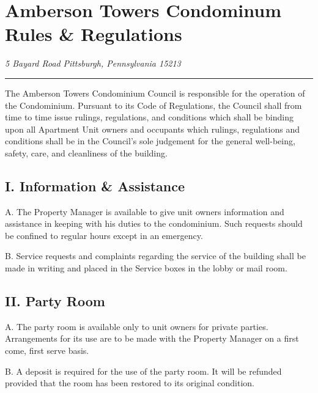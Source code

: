 \documentclass[
]{book}
\begin{document}
\hypertarget{amberson-towers-condominum-rules-regulations-2}{%
\chapter{\texorpdfstring{Amberson Towers Condominum Rules \& Regulations}{Amberson Towers Condominum   Rules \& Regulations}}\label{amberson-towers-condominum-rules-regulations-2}}

\emph{5 Bayard Road}
\emph{Pittsburgh, Pennsylvania 15213}

\begin{center}\rule{0.5\linewidth}{0.5pt}\end{center}

The Amberson Towers Condominium Council is responsible for the operation of the Condominium. Pursuant to its Code of Regulations, the Council shall from time to time issue rulings, regulations, and conditions which shall be binding upon all Apartment Unit owners and occupants which rulings, regulations and conditions shall be in the Council's sole judgement for the general well-being, safety, care, and cleanliness of the building.

\hypertarget{i.-information-assistance-2}{%
\section*{I. Information \& Assistance}\label{i.-information-assistance-2}}

A. The Property Manager is available to give unit owners information and assistance in keeping with his duties to the condominium. Such requests should be confined to regular hours except in an emergency.

B. Service requests and complaints regarding the service of the building shall be made in writing and placed in the Service boxes in the lobby or mail room.

\hypertarget{ii.-party-room-2}{%
\section*{II. Party Room}\label{ii.-party-room-2}}

A. The party room is available only to unit owners for private parties. Arrangements for its use are to be made with the Property Manager on a first come, first serve basis.

B. A deposit is required for the use of the party room. It will be refunded provided that the room has been restored to its original condition.
\end{document}
